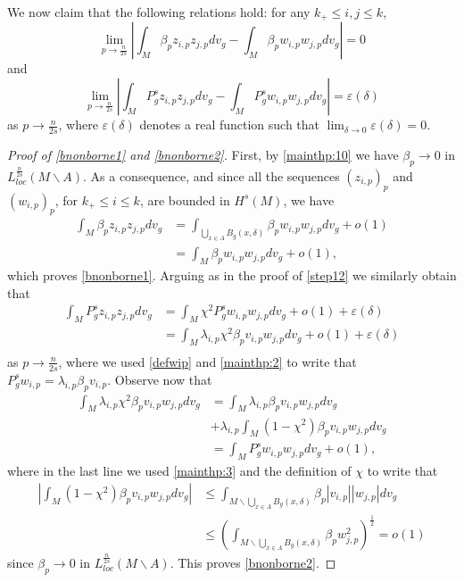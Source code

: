 \documentclass[10pt]{amsart}
\numberwithin{equation}{section}
\newcommand{\ve}{\varepsilon}
\theoremstyle{plain}
\theoremstyle{remark}
\begin{document}
We now claim that the following relations hold: for any $k_+ \le i,j \le k$,
\begin{equation} \label{bnonborne1}
\lim_{p \to \frac{n}{2s}}\left|  \int_M \beta_p z_{i,p} z_{j,p} dv_g -  \int_M \beta_p w_{i,p} w_{j,p} dv_g \right| = 0
\end{equation}
and 
\begin{equation} \label{bnonborne2}
\lim_{p \to \frac{n}{2s}}\left| \int_M P_g^sz_{i,p} z_{j,p} dv_g -  \int_M P_g^s w_{i,p} w_{j,p} dv_g  \right| = \ve(\delta)
\end{equation}
as $p \to \frac{n}{2s}$, where $\ve(\delta)$ denotes a real function such that $\lim_{\delta \to 0} \ve(\delta) = 0$. 

\begin{proof}[Proof of \eqref{bnonborne1} and \eqref{bnonborne2}]
First, by \eqref{mainthp:10} we have $\beta_p \to 0$ in $L^{\frac{n}{2s}}_{loc}(M \backslash A)$. As a consequence, and since all the sequences $(z_{i,p})_p$ and $(w_{i,p})_p$, for $k_+ \le i \le k$, are bounded in $H^s(M)$, we have 
$$  \begin{aligned} 
\int_M \beta_p z_{i,p} z_{j,p} dv_g & = \int_{\bigcup_{x\in A} B_g(x,\delta)} \beta_p w_{i,p} w_{j,p} dv_g + o(1) \\
& =  \int_{M} \beta_p w_{i,p} w_{j,p} dv_g + o(1) ,
\end{aligned} $$ 
which proves \eqref{bnonborne1}. Arguing as in the proof of \eqref{step12}  we similarly obtain that 
$$\begin{aligned}
 \int_M P_g^sz_{i,p} z_{j,p} dv_g & =  \int_M \chi^2 P_g^s w_{i,p} w_{j,p} dv_g + o(1) + \ve(\delta)  \\
 & = \int_M \lambda_{i,p} \chi^2 \beta_p v_{i,p} w_{j,p} dv_g + o(1) + \ve(\delta)\\
 \end{aligned}  $$
as $p \to \frac{n}{2s}$, where we used \eqref{defwip} and \eqref{mainthp:2} to write that $P_g^s w_{i,p} = \lambda_{i,p} \beta_p v_{i,p}$. Observe now that
$$\begin{aligned}
\int_M \lambda_{i,p} \chi^2 \beta_p v_{i,p} w_{j,p} dv_g& =  \int_M \lambda_{i,p} \beta_p v_{i,p} w_{j,p} dv_g  \\
& + \lambda_{i,p} \int_M (1- \chi^2)  \beta_p v_{i,p} w_{j,p} dv_g \\
 & = \int_M P_g^s w_{i,p} w_{j,p} dv_g +  o(1),
 \end{aligned} $$ 
where in the last line we used \eqref{mainthp:3} and the definition of $\chi$ to write that
 $$ \begin{aligned}
\left|  \int_M (1- \chi^2)  \beta_p v_{i,p} w_{j,p} dv_g \right| &\le \int_{M \backslash \bigcup_{x \in A} B_g(x, \delta)} \beta_p |v_{i,p}| | w_{j,p}|  dv_g  \\
& \le \left( \int_{M \backslash \bigcup_{x \in A} B_g(x, \delta)} \beta_p w_{j,p}^2 \right)^{\frac12} = o(1) 
 \end{aligned} $$
 since $\beta_p \to 0$ in $L^{\frac{n}{2s}}_{loc}(M \backslash A)$. This proves \eqref{bnonborne2}.
\end{proof}
\end{document}
